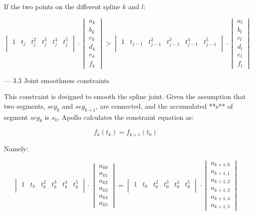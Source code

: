\documentclass[a4paper,11pt]{article}  %
\begin{document}
 If the two points on the different spline $k$ and $l$:

$$
\begin{vmatrix}  1 & t_j & t_j^2 & t_j^3 & t_j^4&t_j^5 \\ \end{vmatrix} 
\cdot 
\begin{vmatrix}  a_k \\ b_k \\ c_k \\ d_k \\ e_k \\ f_k  \end{vmatrix} 
> 
\begin{vmatrix}  1 & t_{j-1} & t_{j-1}^2 & t_{j-1}^3 & t_{j-1}^4&t_{j-1}^5 \\ \end{vmatrix}  
\cdot 
\begin{vmatrix}  a_{l} \\ b_{l} \\ c_{l} \\ d_{l} \\ e_{l} \\ f_{l}  \end{vmatrix}
$$




--- 3.3  Joint smoothness  constraints

This constraint is designed to smooth the spline joint.  Given the assumption that two segments, $seg_k$ and $seg_{k+1}$, are connected, and the accumulated **s** of segment $seg_k$ is $s_k$,  Apollo calculates the constraint equation as: 

$$
f_k(t_k) = f_{k+1} (t_0)
$$

Namely:

$$
\begin{vmatrix} 
 1 & t_k & t_k^2 & t_k^3 & t_k^4&t_k^5 \\
 \end{vmatrix} 
 \cdot 
 \begin{vmatrix} 
 a_{k0} \\ a_{k1} \\ a_{k2} \\ a_{k3} \\ a_{k4} \\ a_{k5} 
 \end{vmatrix} 
 = 
\begin{vmatrix} 
 1 & t_{0} & t_{0}^2 & t_{0}^3 & t_{0}^4&t_{0}^5 \\
 \end{vmatrix} 
 \cdot 
 \begin{vmatrix} 
 a_{k+1,0} \\ a_{k+1,1} \\ a_{k+1,2} \\ a_{k+1,3} \\ a_{k+1,4} \\ a_{k+1,5} 
 \end{vmatrix}
$$
\end{document}
